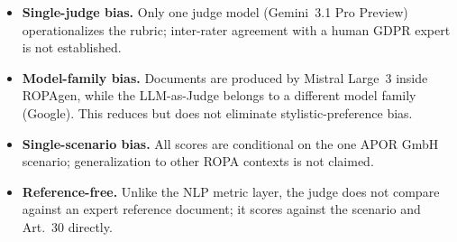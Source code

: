 \begin{itemize}
\item \textbf{Single-judge bias.} Only one judge model (Gemini~3.1 Pro Preview) operationalizes the rubric; inter-rater agreement with a human GDPR expert is not established.
\item \textbf{Model-family bias.} Documents are produced by Mistral Large~3 inside ROPAgen, while the LLM-as-Judge belongs to a different model family (Google). This reduces but does not eliminate stylistic-preference bias.
\item \textbf{Single-scenario bias.} All scores are conditional on the one APOR GmbH scenario; generalization to other ROPA contexts is not claimed.
\item \textbf{Reference-free.} Unlike the NLP metric layer, the judge does not compare against an expert reference document; it scores against the scenario and Art.~30 directly.
\end{itemize}
